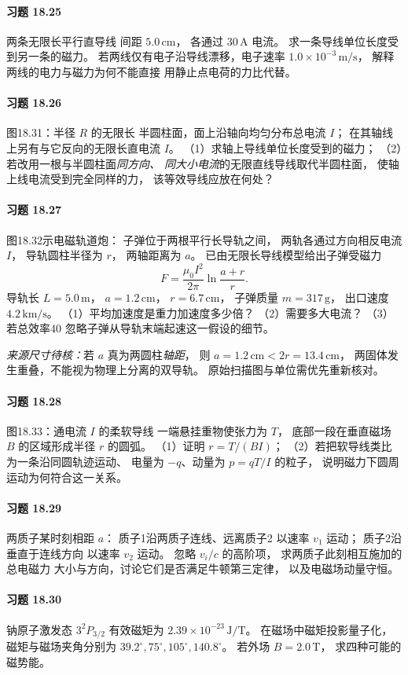 \paragraph{习题 18.25}
两条无限长平行直导线
间距 \(5.0\,\mathrm{cm}\)，
各通过 \(30\,\mathrm A\) 电流。
求一条导线单位长度受到另一条的磁力。
若两线仅有电子沿导线漂移，电子速率
\(1.0\times10^{-3}\,\mathrm{m/s}\)，
解释两线的电力与磁力为何不能直接
用静止点电荷的力比代替。

\paragraph{习题 18.26}
图18.31：半径 \(R\) 的无限长
半圆柱面，面上沿轴向均匀分布总电流 \(I\)；
在其轴线上另有与它反向的无限长直电流 \(I\)。
（1）求轴上导线单位长度受到的磁力；
（2）若改用一根与半圆柱面\emph{同方向、
同大小电流}的无限直线导线取代半圆柱面，
使轴上线电流受到完全同样的力，
该等效导线应放在何处？

\paragraph{习题 18.27}
图18.32示电磁轨道炮：
子弹位于两根平行长导轨之间，
两轨各通过方向相反电流 \(I\)，
导轨圆柱半径为 \(r\)，
两轴距离为 \(a\)。
已由无限长导线模型给出子弹受磁力
\[
 F=\frac{\mu_0I^2}{2\pi}
 \ln\frac{a+r}{r}.
\]
导轨长 \(L=5.0\,\mathrm m\)，
\(a=1.2\,\mathrm{cm}\)，
\(r=6.7\,\mathrm{cm}\)，
子弹质量 \(m=317\,\mathrm g\)，
出口速度 \(4.2\,\mathrm{km/s}\)。
（1）平均加速度是重力加速度多少倍？
（2）需要多大电流？
（3）若总效率40%
忽略子弹从导轨末端起速这一假设的细节。

\textit{来源尺寸待核：}若 \(a\) 真为两圆柱\emph{轴距}，
则 \(a=1.2\,\mathrm{cm}<2r=13.4\,\mathrm{cm}\)，
两固体发生重叠，不能视为物理上分离的双导轨。
原始扫描图与单位需优先重新核对。

\paragraph{习题 18.28}
图18.33：通电流 \(I\) 的柔软导线
一端悬挂重物使张力为 \(T\)，
底部一段在垂直磁场 \(B\)
的区域形成半径 \(r\) 的圆弧。
（1）证明 \(r=T/(BI)\)；
（2）若把软导线类比为一条沿同圆轨迹运动、
电量为 \(-q\)、动量为 \(p=qT/I\) 的粒子，
说明磁力下圆周运动为何符合这一关系。

\paragraph{习题 18.29}
两质子某时刻相距 \(a\)：
质子1沿两质子连线、远离质子2
以速率 \(v_1\) 运动；
质子2沿垂直于连线方向
以速率 \(v_2\) 运动。
忽略 \(v_i/c\) 的高阶项，
求两质子此刻相互施加的总电磁力
大小与方向，讨论它们是否满足牛顿第三定律，
以及电磁场动量守恒。

\paragraph{习题 18.30}
钠原子激发态
\(3^2P_{3/2}\) 有效磁矩为
\(2.39\times10^{-23}\,\mathrm{J/T}\)。
在磁场中磁矩投影量子化，
磁矩与磁场夹角分别为
\(39.2^\circ,75^\circ,105^\circ,140.8^\circ\)。
若外场 \(B=2.0\,\mathrm T\)，
求四种可能的磁势能。

